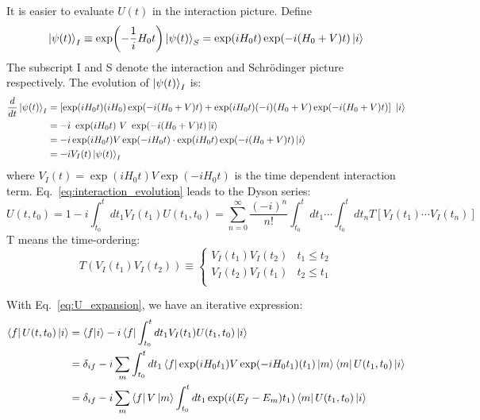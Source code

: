 It is easier to evaluate $U(t)$ in the interaction picture. Define
\begin{equation}
    \ket{\psi(t)}_I \equiv \exp(-\frac{1}{i}H_0 t) \ket{\psi(t)}_S 
    = \exp(iH_0 t) \exp(-i (H_0 + V) t)\ket{i}
\end{equation}
The subscript I and S denote the interaction and Schr\"odinger picture respectively.
The evolution of $\ket{\psi(t)}_I$ is:
\begin{equation}
    \begin{aligned}
	\frac{d}{dt}\ket{\psi(t)}_I 
	&= \left[ \exp(i H_0 t) (iH_0) \exp(-i (H_0 + V) t)
	+ \exp(i H_0 t) (-i)(H_0 + V) \exp(-i (H_0 + V) t) \right] \ \ket{i}  \\
	&= -i\ \exp(i H_0 t)\ V \ \exp(-i (H_0 + V) t) \ket{i}   \\
	&= -i \exp(iH_0 t) V \exp(-iH_0 t) \cdot \exp(iH_0 t) \exp(-i(H_0 + V)t) \ket{i}   \\
	&= -i V_I(t) \ket{\psi(t)}_I
    \end{aligned}
    \label{eq:interaction_evolution}
\end{equation}
where $V_I(t) = \exp(iH_0t)V\exp(-iH_0t)$ is the time dependent interaction term.
Eq.~\ref{eq:interaction_evolution} leads to the Dyson series:
\begin{equation}
    U(t, t_0) = 1 - i\int_{t_0}^t dt_1 V_I(t_1) U(t_1, t_0) = \sum_{n=0}^\infty \frac{(-i)^n}{n!}\int_{t_0}^t dt_1 \cdots \int_{t_0}^t dt_n T[V_I(t_1)\cdots V_I(t_n)]
    \label{eq:U_expansion}
\end{equation}
T means the time-ordering:
\begin{equation}
    T(V_I(t_1) V_I(t_2)) \equiv 
    \begin{cases}
	V_I(t_1)V_I(t_2)    & t_1 \le t_2   \\
	V_I(t_2)V_I(t_1)    & t_2 \le t_1   \\
    \end{cases}
\end{equation}

With Eq.~\ref{eq:U_expansion}, we have an iterative expression:
\begin{equation}
    \begin{aligned}
	\bra{f} U(t, t_0) \ket{i} 
	&= \bra{f}\ket{i} - i \bra{f} \int_{t_0}^t dt_1 V_I(t_1) U(t_1, t_0) \ket{i}	\\
	&= \delta_{if} - i\sum_m \int_{t_0}^t dt_1 \bra{f}\exp(iH_0 t_1) V \exp(-iH_0 t_1)(t_1)\ket{m} \bra{m} U(t_1, t_0) \ket{i} \\
	&= \delta_{if} - i\sum_m \bra{f}V\ket{m} \int_{t_0}^t dt_1 \exp(i(E_f - E_m)t_1) \bra{m}U(t_1, t_0)\ket{i}  \\
    \end{aligned}
    \label{eq:finite_S-matrix}
\end{equation}

